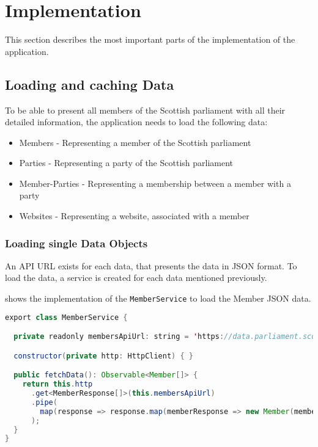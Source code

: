 \section{Implementation}\label{sec:02_impl}
This section describes the most important parts of the implementation of the application.

\subsection{Loading and caching Data}\label{subsec:02_impl_data}
To be able to present all members of the Scottish parliament with all their detailed information, the application needs to load the following data:
\begin{itemize}
\item Members - Representing a member of the Scottish parliament
\item Parties - Representing a party of the Scottish parliament
\item Member-Parties - Representing a membership between a member with a party
\item Websites - Representing a website, associated with a member
\end{itemize}


\subsubsection{Loading single Data Objects}\label{subsubsec:02_impl_data_loading}
An API URL exists for each data, that presents the data in JSON format. To load the data, a service is created for each data mentioned previously.

 shows the implementation of the \texttt{MemberService} to load the Member JSON data.
\begin{lstlisting}[label=lst:02_impl_data_memberservice, caption=\texttt{MemberService} implementation, language=java]
export class MemberService {

  private readonly membersApiUrl: string = 'https://data.parliament.scot/api/members';

  constructor(private http: HttpClient) { }

  public fetchData(): Observable<Member[]> {
    return this.http
      .get<MemberResponse[]>(this.membersApiUrl)
      .pipe(
        map(response => response.map(memberResponse => new Member(memberResponse)))
      );
  }
}
\end{lstlisting}

